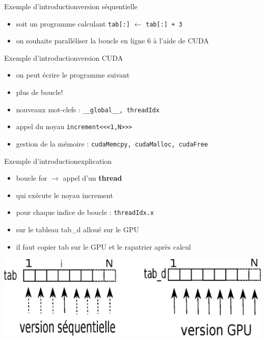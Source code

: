 \documentclass[11pt,mathserif]{beamer}
\begin{document}
\begin{frame}{Exemple d'introduction}{version séquentielle}
\pause
\begin{itemize}[<+->]
 \item soit un programme calculant \texttt{tab[:]} $\leftarrow$ \texttt{tab[:] + 3}

\item on souhaite paralléliser la boucle en ligne 6 à l'aide de CUDA
\end{itemize}
\end{frame}
\begin{frame}{Exemple d'introduction}{version CUDA}
\pause
\begin{itemize}[<+->]
 \item on peut écrire le programme suivant

\item plus de boucle!
\item nouveaux mot-clefs : \texttt{\_\_global\_\_, threadIdx}
\item appel du noyau \texttt{increment<<<1,N>>>}
\item gestion de la mémoire : \texttt{cudaMemcpy, cudaMalloc, cudaFree}
\end{itemize}
\end{frame}
\begin{frame}{Exemple d'introduction}{explication}
\pause
\begin{itemize}[<+->]
 \item boucle \alert{for} $\rightarrow$ appel d'un {\bf thread}
 \item qui exécute le noyau \alert{increment}
 \item pour chaque indice de boucle : \lstinline!threadIdx.x!
 \item sur le tableau \alert{tab\_d} alloué sur le GPU
 \item il faut copier \alert{tab} sur le GPU et le rapatrier après calcul
\end{itemize}
\pause
\begin{center}
\includegraphics[width=0.9\linewidth]{fig/parallel.eps}
\end{center}
\end{frame}
\end{document}
